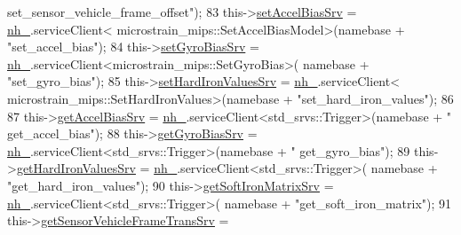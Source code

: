 \begin{DoxyCode}
{      set\_sensor\_vehicle\_frame\_offset"});
83                 this->\hyperlink{classcl__microstrain__mips_1_1ClMicrostainMips_ae2ea11655cba06e49307780d1f95e197}{setAccelBiasSrv} = \hyperlink{classcl__microstrain__mips_1_1ClMicrostainMips_a5a39ba0864ba2c4c003b6ea427538243}{nh\_}.serviceClient<
      microstrain\_mips::SetAccelBiasModel>(namebase + \textcolor{stringliteral}{"set\_accel\_bias"});
84                 this->\hyperlink{classcl__microstrain__mips_1_1ClMicrostainMips_a29fcea0897ca3bd7a036ab5c1856b86c}{setGyroBiasSrv} = \hyperlink{classcl__microstrain__mips_1_1ClMicrostainMips_a5a39ba0864ba2c4c003b6ea427538243}{nh\_}.serviceClient<microstrain\_mips::SetGyroBias>(
      namebase + \textcolor{stringliteral}{"set\_gyro\_bias"});
85                 this->\hyperlink{classcl__microstrain__mips_1_1ClMicrostainMips_abab500a095515c133d5edfea23736fad}{setHardIronValuesSrv} = \hyperlink{classcl__microstrain__mips_1_1ClMicrostainMips_a5a39ba0864ba2c4c003b6ea427538243}{nh\_}.serviceClient<
      microstrain\_mips::SetHardIronValues>(namebase + \textcolor{stringliteral}{"set\_hard\_iron\_values"});
86 
87                 this->\hyperlink{classcl__microstrain__mips_1_1ClMicrostainMips_a79547e77f9122ca67610f153657ec8ac}{getAccelBiasSrv} = \hyperlink{classcl__microstrain__mips_1_1ClMicrostainMips_a5a39ba0864ba2c4c003b6ea427538243}{nh\_}.serviceClient<std\_srvs::Trigger>(namebase + \textcolor{stringliteral}{"
      get\_accel\_bias"});
88                 this->\hyperlink{classcl__microstrain__mips_1_1ClMicrostainMips_a2f3eaec7f31a54d833773ebb5eb03b64}{getGyroBiasSrv} = \hyperlink{classcl__microstrain__mips_1_1ClMicrostainMips_a5a39ba0864ba2c4c003b6ea427538243}{nh\_}.serviceClient<std\_srvs::Trigger>(namebase + \textcolor{stringliteral}{"
      get\_gyro\_bias"});
89                 this->\hyperlink{classcl__microstrain__mips_1_1ClMicrostainMips_a11169f770102e9cff7f3b45c96fb4881}{getHardIronValuesSrv} = \hyperlink{classcl__microstrain__mips_1_1ClMicrostainMips_a5a39ba0864ba2c4c003b6ea427538243}{nh\_}.serviceClient<std\_srvs::Trigger>(
      namebase + \textcolor{stringliteral}{"get\_hard\_iron\_values"});
90                 this->\hyperlink{classcl__microstrain__mips_1_1ClMicrostainMips_a7210454a851669073d06d82511014ecc}{getSoftIronMatrixSrv} = \hyperlink{classcl__microstrain__mips_1_1ClMicrostainMips_a5a39ba0864ba2c4c003b6ea427538243}{nh\_}.serviceClient<std\_srvs::Trigger>(
      namebase + \textcolor{stringliteral}{"get\_soft\_iron\_matrix"});
91                 this->\hyperlink{classcl__microstrain__mips_1_1ClMicrostainMips_abeafc4f48f26ddd264e61b6cf97c779f}{getSensorVehicleFrameTransSrv} = 

\end{DoxyCode}
